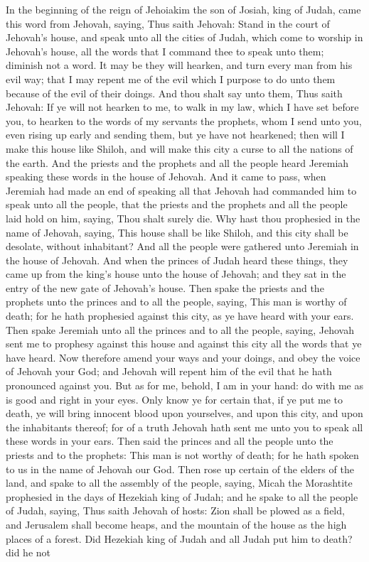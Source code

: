 In the beginning of the reign of Jehoiakim the son of Josiah, king of Judah, came this word from Jehovah, saying, Thus saith Jehovah: Stand in the court of Jehovah’s house, and speak unto all the cities of Judah, which come to worship in Jehovah’s house, all the words that I command thee to speak unto them; diminish not a word. It may be they will hearken, and turn every man from his evil way; that I may repent me of the evil which I purpose to do unto them because of the evil of their doings. And thou shalt say unto them, Thus saith Jehovah: If ye will not hearken to me, to walk in my law, which I have set before you, to hearken to the words of my servants the prophets, whom I send unto you, even rising up early and sending them, but ye have not hearkened; then will I make this house like Shiloh, and will make this city a curse to all the nations of the earth. And the priests and the prophets and all the people heard Jeremiah speaking these words in the house of Jehovah.  And it came to pass, when Jeremiah had made an end of speaking all that Jehovah had commanded him to speak unto all the people, that the priests and the prophets and all the people laid hold on him, saying, Thou shalt surely die. Why hast thou prophesied in the name of Jehovah, saying, This house shall be like Shiloh, and this city shall be desolate, without inhabitant? And all the people were gathered unto Jeremiah in the house of Jehovah.  And when the princes of Judah heard these things, they came up from the king’s house unto the house of Jehovah; and they sat in the entry of the new gate of Jehovah’s house. Then spake the priests and the prophets unto the princes and to all the people, saying, This man is worthy of death; for he hath prophesied against this city, as ye have heard with your ears. Then spake Jeremiah unto all the princes and to all the people, saying, Jehovah sent me to prophesy against this house and against this city all the words that ye have heard. Now therefore amend your ways and your doings, and obey the voice of Jehovah your God; and Jehovah will repent him of the evil that he hath pronounced against you. But as for me, behold, I am in your hand: do with me as is good and right in your eyes. Only know ye for certain that, if ye put me to death, ye will bring innocent blood upon yourselves, and upon this city, and upon the inhabitants thereof; for of a truth Jehovah hath sent me unto you to speak all these words in your ears.  Then said the princes and all the people unto the priests and to the prophets: This man is not worthy of death; for he hath spoken to us in the name of Jehovah our God. Then rose up certain of the elders of the land, and spake to all the assembly of the people, saying, Micah the Morashtite prophesied in the days of Hezekiah king of Judah; and he spake to all the people of Judah, saying, Thus saith Jehovah of hosts: Zion shall be plowed as a field, and Jerusalem shall become heaps, and the mountain of the house as the high places of a forest. Did Hezekiah king of Judah and all Judah put him to death? did he not 